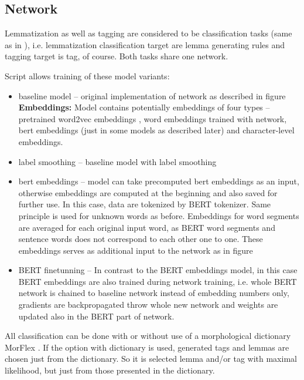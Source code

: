 		
\subsection{Network}
Lemmatization as well as tagging are considered to be classification tasks (same as in \cite[]{straka2019czech}), i.e. lemmatization classification target are lemma generating rules and tagging target is tag, of course. Both tasks share one network.

Script allows training of these model variants:
\begin{itemize}
\item baseline model -- original implementation %
of network as described in figure %
\\ \textbf{Embeddings:} %
Model contains potentially embeddings of four types -- pretrained word2vec embeddings %
, word embeddings trained with network, bert embeddings (just in some models as described later) and character-level embeddings.
\item label smoothing -- baseline model with label smoothing %
\item bert embeddings -- model can take precomputed bert embeddings as an input, otherwise embeddings are computed at the beginning and also saved for further use. In this case, data are tokenized by BERT tokenizer. Same principle is used for unknown words as before. Embeddings for word segments are averaged for each original input word, as BERT word segments and sentence words does not correspond to each other one to one. These embeddings serves as additional input to the network as in figure %
\item BERT finetunning -- In contrast to the BERT embeddings model, in this case BERT embeddings are also trained during network training, i.e. whole BERT network is chained to baseline network instead of embedding numbers only, gradients are backpropagated throw whole new network and weights are updated also in the BERT part of network.
\end{itemize}
All classification can be done with or without use of a morphological dictionary MorFlex %
. If the option with dictionary is used, generated tags and lemmas are chosen just from the dictionary. So it is selected lemma and/or tag with maximal likelihood, but just from those presented in the dictionary.

